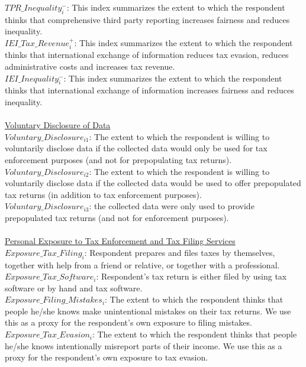 \documentclass[11pt]{article}
\begin{document}
$TPR\_Inequality_i^-$: This index summarizes the extent to which the respondent thinks that comprehensive third party reporting increases fairness and reduces inequality.\\[0.15em]
$IEI\_Tax\_Revenue_i^+$: This index summarizes the extent to which the respondent thinks that international exchange of information reduces tax evasion, reduces administrative costs and increases tax revenue.\\[0.15em]
$IEI\_Inequality_i^-$: This index summarizes the extent to which the respondent thinks that international exchange of information increases fairness and reduces inequality. \\[0.15em]
\\[0.15em]
\underline{Voluntary Disclosure of Data} \\[0.15em]
$Voluntary\_Disclosure_{i1}$: The extent to which the respondent is willing to voluntarily disclose data if the collected data would only be used for tax enforcement purposes (and not for prepopulating tax returns). \\[0.15em]
$Voluntary\_Disclosure_{i2}$: The extent to which the respondent is willing to voluntarily disclose data if the collected data would be used to offer prepopulated tax returns (in addition to tax enforcement purposes).\\[0.15em]
$Voluntary\_Disclosure_{i3}$: the collected data were only used to provide prepopulated tax returns (and not for enforcement purposes).\\[0.15em]
\\[0.15em]
\underline{Personal Exposure to Tax Enforcement and Tax Filing Services} \\[0.15em]
$Exposure\_Tax\_Filing_i$: Respondent prepares and files taxes by themselves, together with help from a friend or relative, or together with a professional.\\[0.15em]
$Exposure\_Tax\_Software_i$: Respondent's tax return is either filed by using tax software or by hand and tax software. \\[0.15em]
$Exposure\_Filing\_Mistakes_i$: The extent to which the respondent thinks that people he/she knows make unintentional mistakes on their tax returns. We use this as a proxy for the respondent's own exposure to filing mistakes.\\[0.15em]
$Exposure\_Tax\_Evasion_i$: The extent to which the respondent thinks that people he/she knows intentionally misreport parts of their income. We use this as a proxy for the respondent's own exposure to tax evasion.\\[0.15em]
\end{document}
